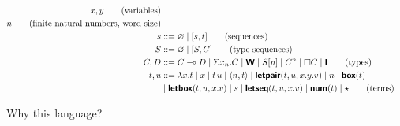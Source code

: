 \begin{align*}
  x,y  \tag{variables}                                                                                                           \\
  n \tag{finite natural numbers, word size}                                                                                      \\
  s    & ::= \varnothing \mid [s, t] \tag{sequences}                                                                             \\
  S    & ::= \varnothing \mid [S, C] \tag{type sequences}                                                                        \\
  C, D & ::= C \multimap D \mid \Sigma x _{n} . C \mid \textsf{\textbf{W}} \mid S[n] \mid C ^n \mid \square C \mid \textsf{\textbf{I}} \tag{types}     \\
  t, u & ::= \lambda x . t \mid x \mid t\,u \mid \langle n, t \rangle \mid \textsf{\textbf{letpair}}(t, u, x.y.v) \mid n \mid \textsf{\textbf{box}}(t) \\
       & \mid \textsf{\textbf{letbox}}(t, u, x.v) \mid s \mid \textsf{\textbf{letseq}}(t, u, x.v) \mid \textsf{\textbf{num}}(t) \mid \star \tag{terms}
\end{align*}

Why this language?

